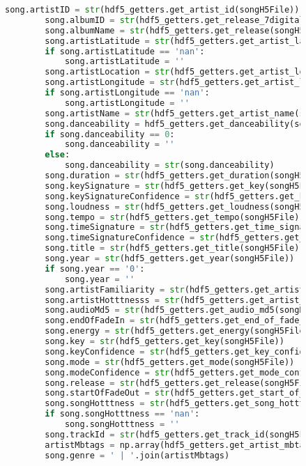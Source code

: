 \begin{figure}
\begin{lstlisting}[language=Python, basicstyle=\footnotesize]
        song.artistID = str(hdf5_getters.get_artist_id(songH5File))
        song.albumID = str(hdf5_getters.get_release_7digitalid(songH5File))
        song.albumName = str(hdf5_getters.get_release(songH5File))
        song.artistLatitude = str(hdf5_getters.get_artist_latitude(songH5File))
        if song.artistLatitude == 'nan':
            song.artistLatitude = ''
        song.artistLocation = str(hdf5_getters.get_artist_location(songH5File))
        song.artistLongitude = str(hdf5_getters.get_artist_longitude(songH5File))
        if song.artistLongitude == 'nan':
            song.artistLongitude = ''
        song.artistName = str(hdf5_getters.get_artist_name(songH5File))
        song.danceability = hdf5_getters.get_danceability(songH5File)
        if song.danceability == 0:
            song.danceability = ''
        else:
            song.danceability = str(song.danceability)
        song.duration = str(hdf5_getters.get_duration(songH5File))
        song.keySignature = str(hdf5_getters.get_key(songH5File))
        song.keySignatureConfidence = str(hdf5_getters.get_key_confidence(songH5File))
        song.loudness = str(hdf5_getters.get_loudness(songH5File))
        song.tempo = str(hdf5_getters.get_tempo(songH5File))
        song.timeSignature = str(hdf5_getters.get_time_signature(songH5File))
        song.timeSignatureConfidence = str(hdf5_getters.get_time_signature_confidence(songH5File))
        song.title = str(hdf5_getters.get_title(songH5File))
        song.year = str(hdf5_getters.get_year(songH5File))
        if song.year == '0':
            song.year = ''
        song.artistFamiliarity = str(hdf5_getters.get_artist_familiarity(songH5File))
        song.artistHotttnesss = str(hdf5_getters.get_artist_hotttnesss(songH5File))
        song.audioMd5 = str(hdf5_getters.get_audio_md5(songH5File))
        song.endOfFadeIn = str(hdf5_getters.get_end_of_fade_in(songH5File))
        song.energy = str(hdf5_getters.get_energy(songH5File))
        song.key = str(hdf5_getters.get_key(songH5File))
        song.keyConfidence = str(hdf5_getters.get_key_confidence(songH5File))
        song.mode = str(hdf5_getters.get_mode(songH5File))
        song.modeConfidence = str(hdf5_getters.get_mode_confidence(songH5File))
        song.release = str(hdf5_getters.get_release(songH5File))
        song.startOfFadeOut = str(hdf5_getters.get_start_of_fade_out(songH5File))
        song.songHotttness = str(hdf5_getters.get_song_hotttnesss(songH5File))
        if song.songHotttness == 'nan':
            song.songHotttness = ''
        song.trackId = str(hdf5_getters.get_track_id(songH5File))
        artistMbtags = np.array(hdf5_getters.get_artist_mbtags(songH5File))
        song.genre = ' | '.join(artistMbtags)


\end{lstlisting}
\end{figure}
